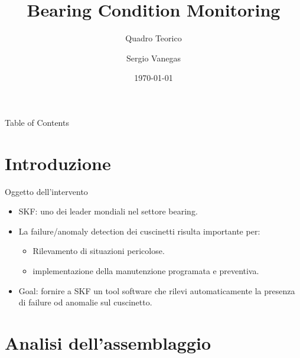 \documentclass{beamer}
\title{Bearing Condition Monitoring}
\subtitle{Quadro Teorico}
\author{Sergio Vanegas}
\institute{Modelway S.r.l.}
\date{\today}
\begin{document}
\frame{\titlepage}

\begin{frame}{Table of Contents}
    \tableofcontents
\end{frame}

\section{Introduzione}

\begin{frame}{Oggetto dell'intervento}
    \begin{itemize}
        \item SKF: uno dei leader mondiali nel settore bearing.
        \item La failure/anomaly detection dei cuscinetti risulta importante per:
        \begin{itemize}
            \item Rilevamento di situazioni pericolose.
            \item implementazione della manutenzione programata e preventiva.
        \end{itemize}
        \item Goal: fornire a SKF un tool software che rilevi automaticamente la presenza di failure od anomalie sul cuscinetto.
    \end{itemize}
\end{frame}

\section{Analisi dell'assemblaggio}
\end{document}
